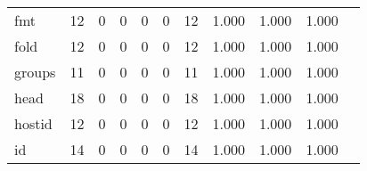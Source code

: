\begin{longtable}{lp{1.20cm}p{1.20cm}p{1.20cm}p{1.20cm}p{1.20cm}p{1.20cm}p{1.20cm}p{1.20cm}p{1.20cm}p{1.20cm}}
fmt       &                                    12 &                                                  0 &                                                  0 &                                                  0 &                                                  0 &                                                 12 &                                         1.000 &                                              1.000 &                                              1.000 \\
fold      &                                    12 &                                                  0 &                                                  0 &                                                  0 &                                                  0 &                                                 12 &                                         1.000 &                                              1.000 &                                              1.000 \\
groups    &                                    11 &                                                  0 &                                                  0 &                                                  0 &                                                  0 &                                                 11 &                                         1.000 &                                              1.000 &                                              1.000 \\
head      &                                    18 &                                                  0 &                                                  0 &                                                  0 &                                                  0 &                                                 18 &                                         1.000 &                                              1.000 &                                              1.000 \\
hostid    &                                    12 &                                                  0 &                                                  0 &                                                  0 &                                                  0 &                                                 12 &                                         1.000 &                                              1.000 &                                              1.000 \\
id        &                                    14 &                                                  0 &                                                  0 &                                                  0 &                                                  0 &                                                 14 &                                         1.000 &                                              1.000 &                                              1.000 \\

\end{longtable}
